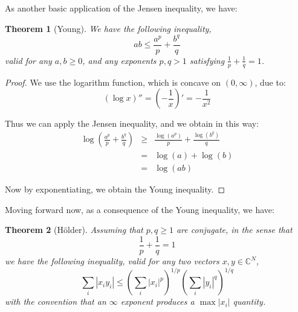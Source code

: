 \documentclass[12pt]{amsbook}
\newtheorem{theorem}{Theorem}[chapter]
\begin{document}
As another basic application of the Jensen inequality, we have:

\begin{theorem}[Young]
We have the following inequality,
$$ab\leq \frac{a^p}{p}+\frac{b^q}{q}$$
valid for any $a,b\geq0$, and any exponents $p,q>1$ satisfying $\frac{1}{p}+\frac{1}{q}=1$. 
\end{theorem}

\begin{proof}
We use the logarithm function, which is concave on $(0,\infty)$, due to:
$$(\log x)''=\left(-\frac{1}{x}\right)'=-\frac{1}{x^2}$$

Thus we can apply the Jensen inequality, and we obtain in this way:
\begin{eqnarray*}
\log\left(\frac{a^p}{p}+\frac{b^q}{q}\right)
&\geq&\frac{\log(a^p)}{p}+\frac{\log(b^q)}{q}\\
&=&\log(a)+\log(b)\\
&=&\log(ab)
\end{eqnarray*}

Now by exponentiating, we obtain the Young inequality.
\end{proof}

Moving forward now, as a consequence of the Young inequality, we have:

\begin{theorem}[H\"older]
Assuming that $p,q\geq 1$ are conjugate, in the sense that 
$$\frac{1}{p}+\frac{1}{q}=1$$
we have the following inequality, valid for any two vectors $x,y\in\mathbb C^N$,
$$\sum_i|x_iy_i|\leq\left(\sum_i|x_i|^p\right)^{1/p}\left(\sum_i|y_i|^q\right)^{1/q}$$
with the convention that an $\infty$ exponent produces a $\max|x_i|$ quantity.
\end{theorem}
\end{document}
